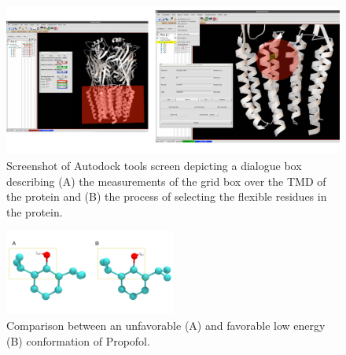 \documentclass[12pt]{article}
\begin{document}
\begin{figure}
\begin{center}
\centering
\includegraphics[width =  1\textwidth]{finlpics/Figure_4}
\caption{Screenshot of Autodock tools screen  depicting a dialogue box describing (A) the measurements of the grid box over the TMD of the protein and (B) the process of selecting the flexible residues in the protein. }
\label{fig:adtPic}
\end{center}
\end{figure}

\begin{figure}
\begin{center}
\centering
\includegraphics[width =  0.5\textwidth]{finlpics/Figure_5}
\caption{Comparison between an unfavorable (A) and favorable low energy (B) conformation of Propofol.}
\label{fig:PFLdihed}
\end{center}
\end{figure}
\end{document}
